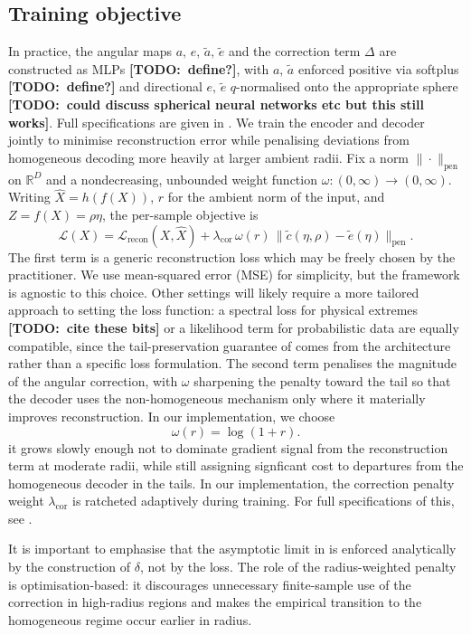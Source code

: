 \documentclass{article}
\theoremstyle{definition}
\newcommand{\todo}[1]{{\color{red}\textbf{[TODO:~#1]}}}
\begin{document}
\subsection{Training objective}
\label{sec:training-objective}

In practice, the angular maps \(a,\,e,\,\tilde a,\,\tilde e\) and the correction term \(\Delta\) are constructed as MLPs \todo{define?}, with \(a,\,\tilde a\) enforced positive via softplus \todo{define?} and directional \(e,\,\tilde e\) \(q\)-normalised onto the appropriate sphere \todo{could discuss spherical neural networks etc but this still works}. Full specifications are given in . We train the encoder and decoder jointly to minimise reconstruction error while penalising deviations from homogeneous decoding more heavily at larger ambient radii. Fix a norm \(\|\cdot\|_{\mathrm{pen}}\) on \(\mathbb{R}^D\) and a nondecreasing, unbounded weight function \(\omega:(0,\infty)\to(0,\infty)\). Writing \(\hat X = h(f(X))\), \(r\) for the ambient norm of the input, and \(Z=f(X)=\rho\eta\), the per-sample objective is
\[
\mathcal{L}(X)
=
\mathcal{L}_{\mathrm{recon}}(X,\hat X)
+
\lambda_{\mathrm{cor}}\,
\omega(r)\,
\bigl\|
\tilde c(\eta,\rho)-\tilde e(\eta)
\bigr\|_{\mathrm{pen}}.
\]
The first term is a generic reconstruction loss which may be freely chosen by the practitioner. We use mean-squared error (MSE) for simplicity, but the framework is agnostic to this choice. Other settings will likely require a more tailored approach to setting the loss function: a spectral loss for physical extremes \todo{cite these bits} or a likelihood term for probabilistic data are equally compatible, since the tail-preservation guarantee of  comes from the architecture rather than a specific loss formulation. The second term penalises the magnitude of the angular correction, with \(\omega\) sharpening the penalty toward the tail so that the decoder uses the non-homogeneous mechanism only where it materially improves reconstruction. In our implementation, we choose
\[
\omega(r)=\log(1+r).
\]
it grows slowly enough not to dominate gradient signal from the reconstruction term at moderate radii, while still assigning signficant cost to departures from the homogeneous decoder in the tails. In our implementation, the correction penalty weight \(\lambda_{\mathrm{cor}}\) is ratcheted adaptively during training. For full specifications of this, see .

It is important to emphasise that the asymptotic limit in  is enforced analytically by the construction of \(\delta\), not by the loss. The role of the radius-weighted penalty is optimisation-based: it discourages unnecessary finite-sample use of the correction in high-radius regions and makes the empirical transition to the homogeneous regime occur earlier in radius.
\end{document}
